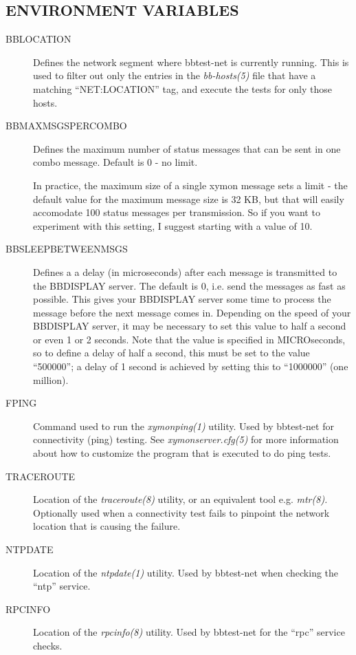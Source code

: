 \subsection{ENVIRONMENT VARIABLES}
\begin{description}
\item[BBLOCATION] Defines the network segment where bbtest-net is
  currently running. This is used to filter out only the entries in
  the \emph{bb-hosts(5)} file that have a matching ``NET:LOCATION''
  tag, and execute the tests for only those hosts. 


 

\item[BBMAXMSGSPERCOMBO] Defines the maximum number of status messages
  that can be sent in one combo message. Default is 0 - no limit.  

 In practice, the maximum size of a single xymon message sets a limit
 - the default value for the maximum message size is 32 KB, but that
 will easily accomodate 100 status messages per transmission. So if
 you want to experiment with this setting, I suggest starting with a
 value of 10. 



\item[BBSLEEPBETWEENMSGS] Defines a a delay (in microseconds) after
  each message is transmitted to the BBDISPLAY server. The default is
  0, i.e. send the messages as fast as possible. This gives your
  BBDISPLAY server some time to process the message before the next
  message comes in. Depending on the speed of your BBDISPLAY server,
  it may be necessary to set this value to half a second or even 1 or
  2 seconds. Note that the value is specified in MICROseconds, so to
  define a delay of half a second, this must be set to the value
  ``500000''; a delay of 1 second is achieved by setting this to
  ``1000000'' (one million). 


 

\item[FPING] Command used to run the \emph{xymonping(1) }
  utility. Used by bbtest-net for connectivity (ping) testing. See
  \emph{xymonserver.cfg(5)} for more information about how to
  customize the program that is executed to do ping tests. 


\item[TRACEROUTE] Location of the \emph{traceroute(8)} utility, or an
  equivalent tool e.g. \emph{mtr(8).} Optionally used when a
  connectivity test fails to pinpoint the network location that is
  causing the failure. 


 

\item[NTPDATE] Location of the \emph{ntpdate(1) }
 utility. Used by bbtest-net when checking the ``ntp'' service. 

 

\item[RPCINFO] Location of the \emph{rpcinfo(8) }
 utility. Used by bbtest-net for the ``rpc'' service checks. 

 


\end{description}
